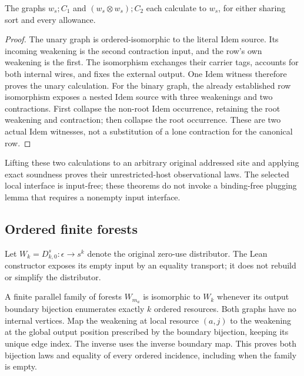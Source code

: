 \begin{lemma}
The graphs $w_s;C_1$ and $(w_s\otimes w_s);C_2$ each calculate to $w_s$,
for either sharing sort and every allowance.
\end{lemma}
\begin{proof}
The unary graph is ordered-isomorphic to the literal Idem source. Its
incoming weakening is the second contraction input, and the row's own
weakening is the first. The isomorphism exchanges their carrier tags,
accounts for both internal wires, and fixes the external output. One Idem
witness therefore proves the unary calculation.
For the binary graph, the already established row isomorphism exposes a
nested Idem source with three weakenings and two contractions. First collapse
the non-root Idem occurrence, retaining the root weakening and contraction;
then collapse the root occurrence. These are two actual Idem witnesses,
not a substitution of a lone contraction for the canonical row.
\end{proof}

Lifting these two calculations to an arbitrary original addressed site and
applying exact soundness proves their unrestricted-host observational laws.
The selected local interface is input-free; these theorems do not invoke a
binding-free plugging lemma that requires a nonempty input interface.

\subsection{Ordered finite forests}
Let $W_k=D^s_{k,0}:\epsilon\to s^k$ denote the original zero-use distributor.
The Lean constructor exposes its empty input by an equality transport;
it does not rebuild or simplify the distributor.

A finite parallel family of forests $W_{m_a}$ is isomorphic to $W_k$ whenever
its output boundary bijection enumerates exactly $k$ ordered resources.
Both graphs have no internal vertices. Map the weakening at local resource
$(a,j)$ to the weakening at the global output position prescribed by the
boundary bijection, keeping its unique edge index. The inverse uses the
inverse boundary map. This proves both bijection laws and equality of every
ordered incidence, including when the family is empty.

